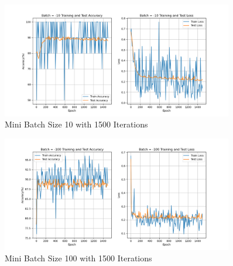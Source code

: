 \documentclass{article}
\begin{document}
\begin{appendix}
\begin{figure}[!htbp]
    \centering
    \includegraphics[width=0.9\textwidth]{img/Part2/curve_batch_-10.png}
    \caption{Mini Batch Size 10 with 1500 Iterations}
    \label{fig:p2batch-10}
\end{figure}


\begin{figure}[!htbp]
    \centering
    \includegraphics[width=0.9\textwidth]{img/Part2/curve_batch_-100.png}
    \caption{Mini Batch Size 100 with 1500 Iterations}
    \label{fig:p2batch-100}
\end{figure}


\end{appendix}
\end{document}
